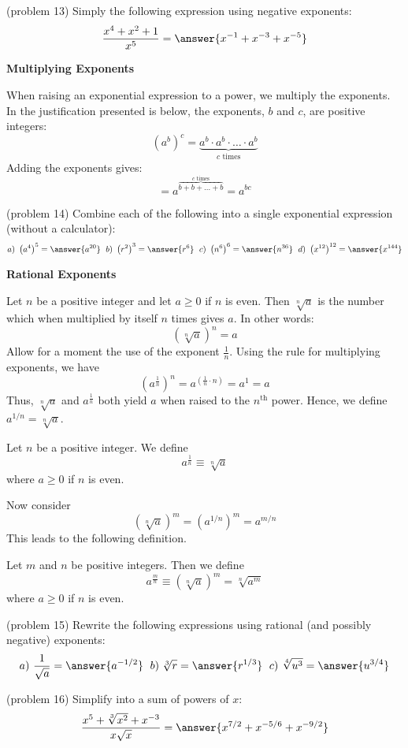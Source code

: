 \documentclass[handout]{ximera}
\begin{document}
\begin{problem}(problem 13)
Simply the following expression using negative exponents:
\[
\frac{x^4 + x^2 + 1}{x^5} = \answer{x^{-1} + x^{-3} + x^{-5}}
\]
\end{problem}


\begin{center}
\textbf{Multiplying Exponents}
\end{center}

When raising an exponential expression to a power, we multiply the exponents. 
In the justification presented is below, the exponents, $b$ and $c$, are positive integers:
\[
\left(a^b\right)^c = \underbrace{a^b \cdot a^b  \cdot \ldots \cdot a^b}_\text{$c$ times}
\]
Adding the exponents gives:
\[
= a^{\overbrace{b + b + \dots +b}^\text{$c$ times}} = a^{bc}
\]

\begin{problem}(problem 14)
Combine each of the following into a single exponential expression (without a calculator):
\[
a) \ \left(a^4\right)^5 = \answer{a^{20}}  \; \  b) \ \left(r^2\right)^3  = \answer{r^6}  \; \  c) \ \left(n^6\right)^6 = \answer{n^{36}} 
 \; \  d) \ \left(x^{12}\right)^{12} = \answer{x^{144}}
\]
\end{problem}

\begin{center}
\textbf{Rational Exponents}
\end{center}
Let $n$ be a positive integer and let $a\geq 0$ if $n$ is even. 
Then  $\sqrt[n] a$ is the number which when multiplied by itself $n$ times gives $a$.
In other words:
\[
(\sqrt[n] a)^n = a
\]
Allow for a moment the use of the exponent $\frac{1}{n}$.  Using the rule for multiplying exponents, we have
\[
\left(a^\frac{1}{n}\right)^n = a^{\left(\frac{1}{n} \cdot n\right)} = a^1 = a
\]
Thus, $\sqrt[n] a$ and $a^\frac{1}{n}$ both yield $a$ when raised to the $n^\text{th}$ power.
Hence, we define $a^{1/n} = \sqrt[n] a$.
\begin{definition}
Let $n$ be a positive integer. We define
\[
a^{\frac{1}{n}} \equiv \sqrt[n] a
\]
where $a \geq 0 $ if $n$ is even.
\end{definition}

Now consider
\[
(\sqrt[n] a)^m = \left(a^{1/n}\right)^m = a^{m/n}
\]
This leads to the following definition.
\begin{definition}
Let $m$ and $n$ be positive integers. Then we define
\[
a^{\frac{m}{n}} \equiv (\sqrt[n] a)^m = \sqrt[n]{a^m}
\]
where $a \geq 0 $ if $n$ is even.
\end{definition}


\begin{problem}(problem 15)
Rewrite the following expressions using rational (and possibly negative) exponents:
\[
a) \ \frac{1}{\sqrt a} = \answer{a^{-1/2}}  \; \  b) \;\sqrt[3] r = \answer{r^{1/3}}  \; \  c) \ \sqrt[4]{u^3} = \answer{u^{3/4}}
\]
\end{problem}


\begin{problem}(problem 16)
Simplify into a sum of powers of $x$: 
\[
\frac{x^5 + \sqrt[3]{x^2} + x^{-3}}{x\sqrt x} = \answer{x^{7/2} + x^{-5/6} + x^{-9/2}}
\]
\end{problem}
\end{document}
